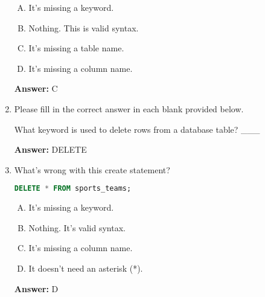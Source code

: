 \documentclass[12pt]{article}
\begin{document}
\begin{enumerate}[1.]
    \bigskip

    \begin{enumerate}[A.]
        \item It's missing a keyword.
        \item Nothing. This is valid syntax.
        \item It's missing a table name.
        \item It's missing a column name.
    \end{enumerate}

    \bigskip

    \textbf{Answer:} C

    \item

    Please fill in the correct answer in each blank provided below.

    \bigskip

    What keyword is used to delete rows from a database table?  \_\_\_

    \bigskip

    \textbf{Answer:} DELETE

    \item

    What's wrong with this create statement?

    \begin{lstlisting}[language=SQL]
    DELETE * FROM sports_teams;
    \end{lstlisting}

    \bigskip

    \begin{enumerate}[A.]
        \item It's missing a keyword.
        \item Nothing. It's valid syntax.
        \item It's missing a column name.
        \item It doesn't need an asterisk (*).
    \end{enumerate}

    \bigskip

    \textbf{Answer:} D


\end{enumerate}
\end{document}
